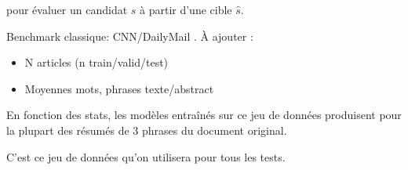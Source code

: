 pour évaluer un candidat $s$ à partir d'une cible $\hat{s}$.


Benchmark classique: CNN/DailyMail \citep{DBLP:journals/corr/SeeLM17}. À ajouter :

\begin{itemize}
    \item N articles (n train/valid/test)
    \item Moyennes mots, phrases texte/abstract
\end{itemize}

En fonction des stats, les modèles entraînés sur ce jeu de données produisent
pour la plupart des résumés de 3 phrases du document original.

C'est ce jeu de données qu'on utilisera pour tous les tests.

